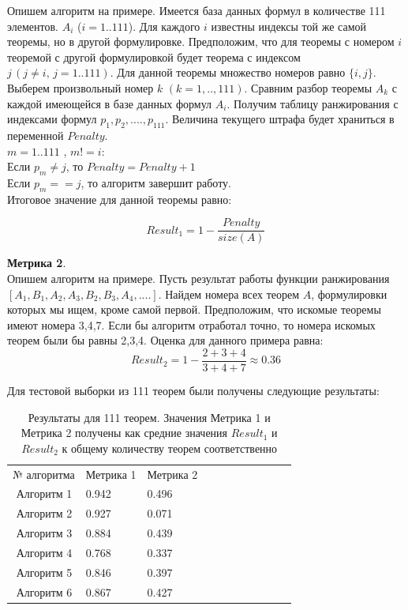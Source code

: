 \documentclass[12pt]{article}
\begin{document}
Опишем алгоритм на примере. Имеется база данных формул в количестве 111 элементов. $A_i$ ($i=1..111$). Для каждого $i$  известны индексы той же самой теоремы, но в другой формулировке. Предположим, что для теоремы с номером $i$ теоремой с другой формулировкой будет теорема  с индексом $j \,(j \neq i, \, j=1..111)$. Для данной теоремы множество номеров равно $\{i,j\}$. \\

Выберем произвольный номер $k \,\, (k=1,..,111)$. Сравним разбор теоремы $A_k$ с каждой имеющейся в базе данных формул $A_i$. Получим таблицу ранжирования с индексами формул $p_1,p_2,....,p_{111}$. Величина текущего штрафа будет храниться в переменной $Penalty$. \\

$m=1..111$ , $m!=i$:\\

Если $p_m \neq j$, то $Penalty=Penalty+1$\\

Если $p_m == j$, то алгоритм завершит работу. \\

Итоговое значение для данной теоремы равно:

$$Result_1=1-\dfrac{Penalty}{size(A)}$$

\textbf{Метрика 2}.\\

Опишем алгоритм на примере. Пусть результат работы функции ранжирования $[A_1,B_1,A_2,A_3,B_2,B_3,A_4,....]$. Найдем номера всех теорем $A$, формулировки которых мы ищем, кроме самой первой. Предположим, что искомые теоремы имеют номера 3,4,7. Если бы  алгоритм отработал точно, то номера искомых теорем были бы равны 2,3,4. Оценка для данного примера равна:
$$Result_2=1-\dfrac{2+3+4}{3+4+7} \approx 0.36$$

Для тестовой выборки из 111 теорем были получены следующие результаты:
\begin{table}[h!]
\centering
\begin{tabular}{ l l l l l l l l  l l  l }
№ алгоритма & Метрика 1 & Метрика 2 \\
\,\,Алгоритм 1 & 0.942 & 0.496\\
\,\,Алгоритм 2 & 0.927 & 0.071 \\
\,\,Алгоритм 3 & 0.884 & 0.439 \\
\,\,Алгоритм 4 & 0.768& 0.337 \\
\,\,Алгоритм 5 & 0.846 & 0.397 \\
\,\,Алгоритм 6 & 0.867 & 0.427 \\
\end{tabular}
\caption{Результаты для 111 теорем. Значения Метрика 1 и Метрика 2 получены как средние значения $Result_1$ и $Result_2$ к общему количеству теорем соответственно}
\end{table} 
\end{document}
